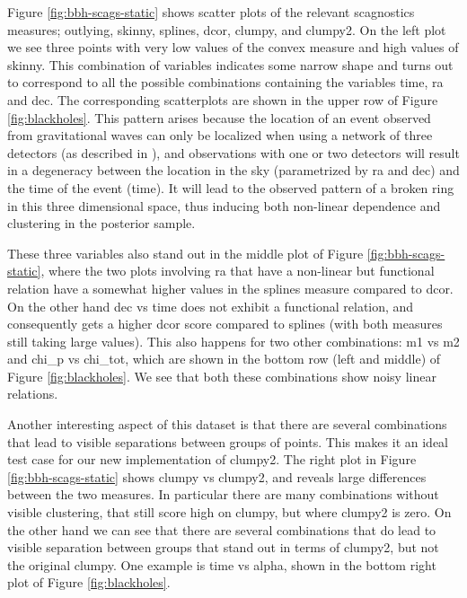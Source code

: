 Figure \ref{fig:bbh-scags-static} shows scatter plots of the relevant scagnostics measures; outlying, skinny, splines, dcor, clumpy, and clumpy2. On the left plot we see three points with very low values of the convex measure and high values of skinny. This combination of variables indicates some narrow shape and turns out to correspond to all the possible combinations containing the variables time, ra and dec. The corresponding scatterplots are shown in the upper row of Figure \ref{fig:blackholes}. This pattern arises because the location of an event observed from gravitational waves can only be localized when using a network of three detectors (as described in \citet{gwtriang}), and observations with one or two detectors will result in a degeneracy between the location in the sky (parametrized by ra and dec) and the time of the event (time). It will lead to the observed pattern of a broken ring in this three dimensional space, thus inducing both non-linear dependence and clustering in the posterior sample.

These three variables also stand out in the middle plot of Figure \ref{fig:bbh-scags-static}, where the two plots involving ra that have a non-linear but functional relation have a somewhat higher values in the splines measure compared to dcor. On the other hand dec vs time does not exhibit a functional relation, and consequently gets a higher dcor score compared to splines (with both measures still taking large values). This also happens for two other combinations: m1 vs m2 and chi\_p vs chi\_tot, which are shown in the bottom row (left and middle) of Figure \ref{fig:blackholes}. We see that both these combinations show noisy linear relations.

Another interesting aspect of this dataset is that there are several combinations that lead to visible separations between groups of points. This makes it an ideal test case for our new implementation of clumpy2. The right plot in Figure \ref{fig:bbh-scags-static} shows clumpy vs clumpy2, and reveals large differences between the two measures. In particular there are many combinations without visible clustering, that still score high on clumpy, but where clumpy2 is zero. On the other hand we can see that there are several combinations that do lead to visible separation between groups that stand out in terms of clumpy2, but not the original clumpy. One example is time vs alpha, shown in the bottom right plot of Figure \ref{fig:blackholes}.

